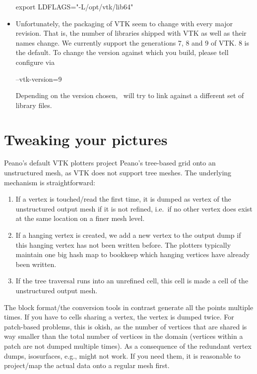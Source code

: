 \begin{itemize}
\begin{code}
export LDFLAGS="-L/opt/vtk/lib64"
\end{code}
  \item Unfortunately, the packaging of VTK seem to change with every major
  revision. That is, the number of libraries shipped with VTK as well as their
  names change. We currently support the generations 7, 8 and 9 of VTK. 8 is the
  default. To change the version against which you build, please tell configure
  via
\begin{code}
--vtk-version=9
\end{code}
  Depending on the version chosen, \Peano\ will try to link against a different
  set of library files.
\end{itemize}

    
    
    
\section{Tweaking your pictures}

Peano's default VTK plotters project Peano's tree-based grid onto an
unstructured mesh, as VTK does not support tree meshes.
The underlying mechanism is straightforward:

\begin{enumerate}
  \item If a vertex is touched/read the first time, it is dumped as vertex of
  the unstructured output mesh if it is not refined, i.e.~if no other vertex
  does exist at the same location on a finer mesh level.
  \item If a hanging vertex is created, we add a new vertex to the output dump
  if this hanging vertex has not been written before. The plotters typically
  maintain one big hash map to bookkeep which hanging vertices have already been
  written.
  \item If the tree traversal runs into an unrefined cell, this cell is made a
  cell of the unstructured output mesh.
\end{enumerate}


The block format/the conversion tools in contrast generate all the points
multiple times.
If you have to cells sharing a vertex, the vertex is dumped twice.
For patch-based problems, this is okish, as the number of vertices that are
shared is way smaller than the total number of vertices in the domain (vertices
within a patch are not dumped multiple times).
As a consequence of the redundant vertex dumps, isosurfaces, e.g., might not
work.
If you need them, it is reasonable to project/map the actual data onto a regular
mesh first.


